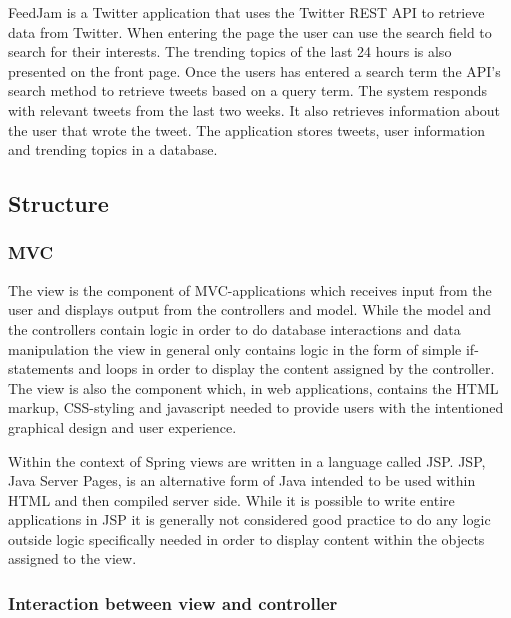 FeedJam is a Twitter application that uses the Twitter REST API to retrieve data from Twitter. When entering the page the user can use the search field to search for their interests. The trending topics of the last 24 hours is also presented on the front page. Once the users has entered a search term the API's search method to retrieve tweets based on a query term. 
The system responds with relevant tweets from the last two weeks. It also retrieves information about the user that wrote the tweet. The application stores tweets, user information and trending topics in a database. 

\subsection{Structure}
\subsubsection{MVC} %

The view is the component of MVC-applications which receives input from the user and displays output from the controllers and model. While the model and the controllers contain logic in order to do database interactions and data manipulation the view in general only contains logic in the form of simple if-statements and loops in order to display the content assigned by the controller. The view is also the component which, in web applications, contains the HTML markup, CSS-styling and javascript needed to provide users with the intentioned graphical design and user experience.

Within the context of Spring views are written in a language called JSP. JSP, Java Server Pages, is an alternative form of Java intended to be used within HTML and then compiled server side. While it is possible to write entire applications in JSP it is generally not considered good practice to do any logic outside logic specifically needed in order to display content within the objects assigned to the view. 


\subsubsection{Interaction between view and controller} %

